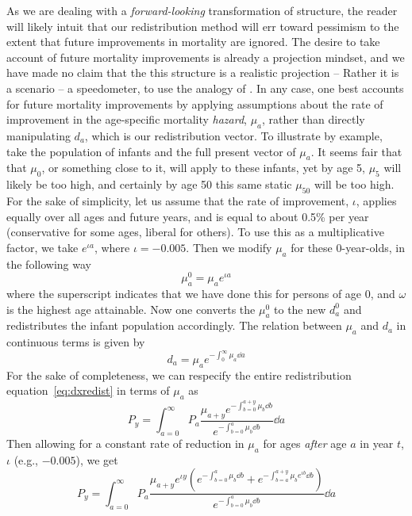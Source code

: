 \FloatBarrier
\label{sec:eximprov}
As we are dealing with a \textit{forward-looking} \citep{sanderson2007new}
transformation of structure, the reader will likely intuit that our redistribution 
method will err toward pessimism to the extent that
future improvements in mortality are ignored. The desire to take account of
future mortality improvements is already a projection mindset, and we have made
no claim that the this structure is a realistic projection -- Rather it is a
scenario -- a speedometer, to use the analogy of \citet{coale1972growth}. In any
case, one best accounts for future mortality improvements by applying assumptions about the rate of
improvement in the age-specific mortality \textit{hazard}, $\mu_a$, rather than
directly manipulating $d_a$, which is our redistribution vector. To illustrate by
example, take the population of infants and the full present vector of $\mu_a$. It seems fair that
that $\mu_0$, or something close to it, will apply to these infants, yet by age
5, $\mu_5$ will likely be too high, and certainly by age 50
this same static $\mu_{50}$ will be too high. For the sake of simplicity, let us
assume that the rate of improvement, $\iota$, applies equally over all ages and future years,
and is equal to about 0.5\% per year (conservative for some ages, liberal
for others). To use this as a multiplicative factor, we take $e^{\iota a}$,
where $\iota = -0.005$. Then we modify $\mu_a$ for these 0-year-olds, in the
following way
\begin{equation}
\mu_a^0 = \mu_a e^{\iota a} 
\end{equation}
where the superscript indicates that we have done this for persons of age 0, and
$\omega$ is the highest age attainable. Now one converts the $\mu _a^0$ to the
new $d_a^0$ and redistributes the infant population accordingly. The relation
between $\mu_a$ and $d_a$ in continuous terms is given by
\begin{equation}
d_a = \mu_a e^{-\int_0^\infty \mu_a \dd a}
\end{equation}
For the sake of completeness, we can respecify the entire redistribution
equation~\eqref{eq:dxredist} in terms of $\mu_a$ as
\begin{equation}
P_y = \int _{a=0}^\infty P_a \frac{\mu_{a+y} e^{-\int_{b=0}^{a+y} \mu_b \dd
b}}{e^{-\int_{b=0}^a \mu_b \dd b}} \dd a
\end{equation}
Then allowing for a constant rate of reduction in $\mu_a$ for ages
\textit{after} age $a$ in year $t$, $\iota$ (e.g., $-0.005$), we get
\begin{equation}
P_y = \int_{a=0}^\infty P_a \frac{\mu_{a+y}e^{\iota y} (e^{-\int_{b=0}^a\mu_b
\dd b}+e^{-\int_{b=a}^{a+y} \mu_b e^{\iota b} \dd b})}{e^{-\int_{b=0}^a \mu_b
\dd b}} \dd a
\end{equation}
